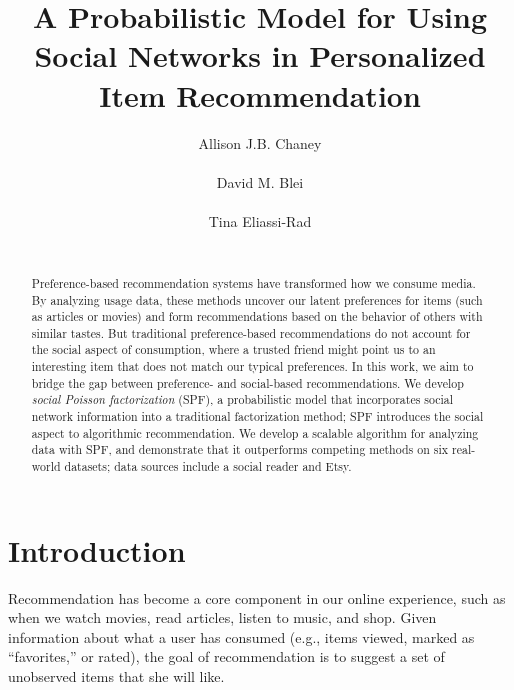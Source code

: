 \documentclass{sig-alternate-2013}
\begin{document}
\title{A Probabilistic Model for Using Social Networks in Personalized
  Item Recommendation}

\author{
\alignauthor
Allison J.B. Chaney\\
       \\
\alignauthor
David M. Blei\\
       \\
\alignauthor
Tina Eliassi-Rad\\
       \\
}


\maketitle
\begin{abstract}
Preference-based recommendation systems have transformed how we
consume media.  By analyzing usage data, these methods uncover our
latent preferences for items (such as articles or movies) and form
recommendations based on the behavior of others with similar tastes.
But traditional preference-based recommendations do not account for
the social aspect of consumption, where a trusted friend might point
us to an interesting item that does not match our typical preferences.
In this work, we aim to bridge the gap between preference- and
social-based recommendations.  We develop \textit{social
Poisson factorization} (SPF), a probabilistic model that incorporates social
network information into a traditional factorization method; SPF
introduces the social aspect to algorithmic
recommendation.  We develop a scalable algorithm for analyzing data
with SPF, and demonstrate that it outperforms competing methods
on six real-world datasets; data sources include a social reader and Etsy.
\end{abstract}



\section{Introduction}
Recommendation has become a core component in our online
experience, such as when we watch movies, read articles, listen to
music, and shop.  Given information about what a user has consumed
(e.g., items viewed, marked as ``favorites,'' or rated), the goal of
recommendation is to suggest a set of unobserved items that she will
like.
\end{document}

